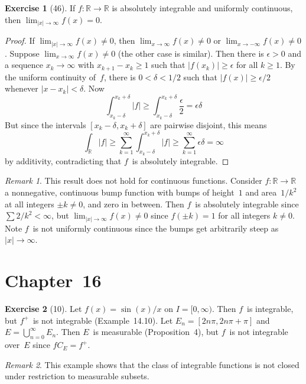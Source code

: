\documentclass[letterpaper,12pt]{article}
\newcommand{\R}{\mathbb{R}}
\newcommand{\bigunion}{\bigcup}
\newcommand{\abs}[1]{|{#1}|}
\newcommand{\pos}[1]{#1^{+}}
\theoremstyle{plain}
\theoremstyle{definition}
\newtheorem*{exer}{Exercise}
\theoremstyle{remark}
\newtheorem*{rmk}{Remark}
\begin{document}
\begin{exer}[46]
If \(f:\R\to\R\) is absolutely integrable and uniformly continuous, then \(\lim_{\abs{x}\to\infty}f(x)=0\).
\end{exer}
\begin{proof}
If \(\lim_{\abs{x}\to\infty}f(x)\ne 0\), then \(\lim_{x\to\infty}f(x)\ne 0\) or \(\lim_{x\to-\infty}f(x)\ne 0\). Suppose \(\lim_{x\to\infty}f(x)\ne 0\) (the other case is similar). Then there is \(\epsilon>0\)  and a sequence \(x_k\to\infty\) with \(x_{k+1}-x_k\ge 1\) such that \(\abs{f(x_k)}\ge\epsilon\) for all \(k\ge 1\). By the uniform continuity of~\(f\), there is \(0<\delta<1/2\) such that \(\abs{f(x)}\ge\epsilon/2\) whenever \(\abs{x-x_k}<\delta\). Now
\[\int_{x_k-\delta}^{x_k+\delta}\abs{f}\ge\int_{x_k-\delta}^{x_k+\delta}\frac{\epsilon}{2}=\epsilon\delta\]
But since the intervals \([x_k-\delta,x_k+\delta]\) are pairwise disjoint, this means
\[\int_{\R}\abs{f}\ge\sum_{k=1}^{\infty}\int_{x_k-\delta}^{x_k+\delta}\abs{f}\ge\sum_{k=1}^{\infty}\epsilon\delta=\infty\]
by additivity, contradicting that \(f\)~is absolutely integrable.
\end{proof}
\begin{rmk}
This result does not hold for continuous functions. Consider \(f:\R\to\R\) a nonnegative, continuous bump function with bumps of height~\(1\) and area~\(1/k^2\) at all integers \(\pm k\ne0\), and zero in between. Then \(f\)~is absolutely integrable since \(\sum 2/k^2<\infty\), but \(\lim_{\abs{x}\to\infty}f(x)\ne 0\) since \(f(\pm k)=1\) for all integers \(k\ne 0\). Note \(f\)~is not uniformly continuous since the bumps get arbitrarily steep as \(\abs{x}\to\infty\).
\end{rmk}

\section*{Chapter~16}
\begin{exer}[10]
Let \(f(x)=\sin(x)/x\) on \(I=[0,\infty)\). Then \(f\)~is integrable, but \(\pos{f}\)~is not integrable (Example~14.10). Let \(E_n=[2n\pi, 2n\pi+\pi]\) and \(E=\bigunion_{n=0}^{\infty}E_n\). Then \(E\)~is measurable (Proposition~4), but \(f\)~is not integrable over~\(E\) since \(fC_E=\pos{f}\).
\end{exer}
\begin{rmk}
This example shows that the class of integrable functions is not closed under restriction to measurable subsets.
\end{rmk}
\end{document}
